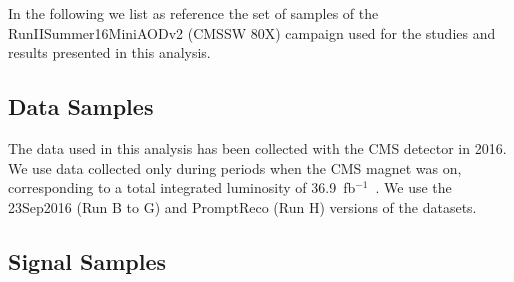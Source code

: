 In the following we list as reference the set of samples of the RunIISummer16MiniAODv2
(CMSSW 80X) campaign used for the studies and results presented in this analysis.

\subsection{Data Samples}
The data used in this analysis has been collected with the CMS detector in 2016. 
We use data collected only during periods when the CMS magnet was on, 
corresponding to a total integrated luminosity of 36.9~fb$^{-1}$~\cite{goldjson}.
We use the 23Sep2016 (Run B to G) and PromptReco (Run H) versions of the datasets.

%

\subsection{Signal Samples}

